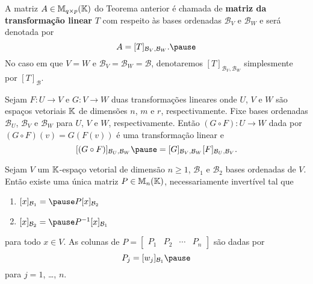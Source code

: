 \documentclass{beamer}
\begin{document}
\begin{frame}
    \begin{definicao}
        A matriz $A \in \mathbb{M}_{q\times p}(\mathbb{K})$ do Teorema anterior \pause é chamada de \textbf{matriz da transformação linear} \pause $T$ com respeito às bases ordenadas $\mathcal{B}_V$ e $\mathcal{B}_W$ \pause e será denotada por\pause
        \[
            A = [T]_{\mathcal{B}_{V},\mathcal{B}_{W}}.\pause
        \]
        No caso em que $V = W$ \pause e $\mathcal{B}_V = \mathcal{B}_W = \mathcal{B}$, \pause denotaremos $[T]_{\mathcal{B}_{V},\mathcal{B}_{W}}$ \pause simplesmente por $[T]_\mathcal{B}$.
    \end{definicao}
\end{frame}

\begin{frame}
    \begin{teorema}\label{matriz_da_composicao_de_transformacoes}
        Sejam $F \colon U \to V$ \pause e $G \colon V \to W$ \pause duas transformações lineares onde $U$, $V$ e $W$ \pause são espaços vetoriais $\mathbb{K}$ \pause de dimensões $n$, $m$ e $r$, respectivamente. \pause Fixe bases ordenadas $\mathcal{B}_U$, \pause $\mathcal{B}_V$ \pause e $\mathcal{B}_W$ \pause para $U$, $V$ e $W$, respectivamente. \pause Então $(G \circ F) \colon U \to W$ \pause dada por $(G\circ F)(v) = G(F(v))$ \pause é uma transformação linear e\pause
        \[
            [(G \circ F)]_{{\mathcal{B}_U},{\mathcal{B}_W}} \pause = [G]_{{\mathcal{B}_V},{\mathcal{B}_W}}[F]_{{\mathcal{B}_U},{\mathcal{B}_V}}.
        \]
    \end{teorema}
\end{frame}

\begin{frame}
    \begin{teorema}\label{teorema_mudanca_base}
        Sejam $V$ um $\mathbb{K}$-espaço vetorial de dimensão $n \ge 1$, \pause $\mathcal{B}_1$ e $\mathcal{B}_2$ bases ordenadas de $V$. \pause Então existe uma única matriz $P \in \mathbb{M}_n(\mathbb{K})$, \pause necessariamente invertível tal que\pause
        \begin{enumerate}[label={\roman*})]
            \item $[x]_{\mathcal{B}_1} = \pause P[x]_{\mathcal{B}_2}$\pause

            \item $[x]_{\mathcal{B}_2} = \pause P^{-1}[x]_{\mathcal{B}_1}$\pause
        \end{enumerate}
        para todo $x \in V$. \pause As colunas de $P = \begin{bmatrix}P_1 & P_2 & \cdots & P_n \end{bmatrix}$ \pause são dadas por\pause
        \[
            P_j = [w_j]_{\mathcal{B}_1}\pause
        \]
        para $j = 1$, \dots, $n$.
    \end{teorema}
\end{frame}
\end{document}
